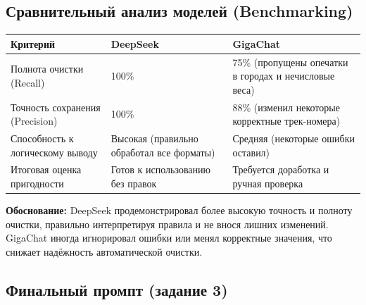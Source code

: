 \documentclass[oneside,a4paper,14pt]{extarticle} %
\begin{document}
\subsection{Сравнительный анализ моделей (Benchmarking)}
\noindent
\begin{table}[H]
\centering
\begin{tabular}{|p{4cm}|p{6cm}|p{6cm}|}
\hline
\textbf{Критерий} & \textbf{DeepSeek} & \textbf{GigaChat} \\ \hline
Полнота очистки (Recall) & 100\% & 75\% (пропущены опечатки в городах и нечисловые веса) \\ \hline
Точность сохранения (Precision) & 100\% & 88\% (изменил некоторые корректные трек-номера) \\ \hline
Способность к логическому выводу & Высокая (правильно обработал все форматы) & Средняя (некоторые ошибки оставил) \\ \hline
Итоговая оценка пригодности & Готов к использованию без правок & Требуется доработка и ручная проверка \\ \hline
\end{tabular}
\end{table}
\noindent
\textbf{Обоснование:} DeepSeek продемонстрировал более высокую точность и полноту очистки, правильно интерпретируя правила и не внося лишних изменений. GigaChat иногда игнорировал ошибки или менял корректные значения, что снижает надёжность автоматической очистки.
\subsection{Финальный промпт (задание 3)}

\newpage
\end{document}
